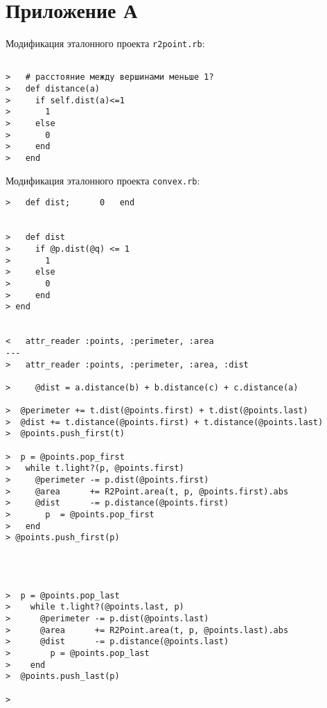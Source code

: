 \section{Приложение А}

Модификация эталонного проекта \texttt{r2point.rb}:

\begin{small}
\begin{verbatim}

>   # расстояние между вершинами меньше 1?
>   def distance(a)
>     if self.dist(a)<=1
>       1
>     else
>       0
>     end
>   end
\end{verbatim}
\end{small}

Модификация эталонного проекта \texttt{convex.rb}:
\begin{small}
\begin{verbatim}
>   def dist;      0   end

 
>   def dist
>     if @p.dist(@q) <= 1
>       1
>     else
>       0
>     end
> end
 

<   attr_reader :points, :perimeter, :area
---
>   attr_reader :points, :perimeter, :area, :dist
 
>     @dist = a.distance(b) + b.distance(c) + c.distance(a)
 
>  @perimeter += t.dist(@points.first) + t.dist(@points.last)
>  @dist += t.distance(@points.first) + t.distance(@points.last)
>  @points.push_first(t)
 
>  p = @points.pop_first
>   while t.light?(p, @points.first)
>     @perimeter -= p.dist(@points.first)
>     @area      += R2Point.area(t, p, @points.first).abs
>     @dist      -= p.distance(@points.first)
>       p  = @points.pop_first
>   end
> @points.push_first(p)




>  p = @points.pop_last
>    while t.light?(@points.last, p)
>      @perimeter -= p.dist(@points.last)
>      @area      += R2Point.area(t, p, @points.last).abs
>      @dist      -= p.distance(@points.last)
>        p = @points.pop_last
>    end
>  @points.push_last(p)

> 
\end{verbatim}
\end{small}
